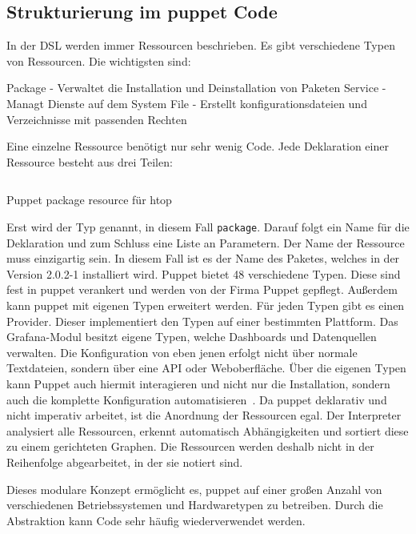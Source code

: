 \subsection{Strukturierung im puppet Code}
In der DSL werden immer Ressourcen beschrieben. Es gibt verschiedene Typen von
Ressourcen. Die wichtigsten sind:

\begin{outline}
  \1 Package - Verwaltet die Installation und Deinstallation von Paketen
  \1 Service - Managt Dienste auf dem System
  \1 File - Erstellt konfigurationsdateien und Verzeichnisse mit passenden
  Rechten
\end{outline}

Eine einzelne Ressource benötigt nur sehr wenig Code. Jede Deklaration einer
Ressource besteht aus drei Teilen:

\begin{listing}
   \inputminted{puppet}{../listings/basic-resource.txt}
   \caption{Puppet package resource für htop}
   \label{lst:puppet-resource}
\end{listing}

Erst wird der Typ genannt, in diesem Fall \texttt{package}. Darauf folgt ein
Name für die Deklaration und zum Schluss eine Liste an Parametern. Der Name der
Ressource muss einzigartig sein. In diesem Fall ist es der Name des Paketes,
welches in der Version 2.0.2-1 installiert wird. Puppet bietet 48 verschiedene
Typen. Diese sind fest in puppet verankert und werden von der Firma Puppet
gepflegt. Außerdem kann puppet mit eigenen Typen erweitert werden. Für jeden
Typen gibt es einen Provider. Dieser implementiert den Typen auf einer
bestimmten Plattform. Das Grafana-Modul besitzt eigene Typen, welche Dashboards
und Datenquellen verwalten. Die Konfiguration von eben jenen erfolgt nicht über
normale Textdateien, sondern über eine API oder Weboberfläche. Über die eigenen
Typen kann Puppet auch hiermit interagieren und nicht nur die Installation,
sondern auch die komplette Konfiguration
automatisieren~\cite{puppet-resource-types}. Da puppet deklarativ und nicht
imperativ arbeitet, ist die Anordnung der Ressourcen egal. Der Interpreter
analysiert alle Ressourcen, erkennt automatisch Abhängigkeiten und sortiert
diese zu einem gerichteten Graphen. Die Ressourcen werden deshalb nicht in der
Reihenfolge abgearbeitet, in der sie notiert sind.

Dieses modulare Konzept ermöglicht es, puppet auf einer großen Anzahl von
verschiedenen Betriebssystemen und Hardwaretypen zu betreiben. Durch die
Abstraktion kann Code sehr häufig wiederverwendet werden.

